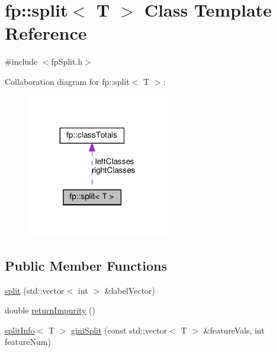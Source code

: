 \hypertarget{classfp_1_1split}{}\section{fp\+:\+:split$<$ T $>$ Class Template Reference}
\label{classfp_1_1split}


{\ttfamily \#include $<$fp\+Split.\+h$>$}



Collaboration diagram for fp\+:\+:split$<$ T $>$\+:\nopagebreak
\begin{figure}[H]
\begin{center}
\leavevmode
\includegraphics[width=176pt]{classfp_1_1split__coll__graph}
\end{center}
\end{figure}
\subsection*{Public Member Functions}
\begin{DoxyCompactItemize}
\item 
\hyperlink{classfp_1_1split_aa4634b2460fcbe77440805d0526e72b6}{split} (std\+::vector$<$ int $>$ \&label\+Vector)
\item 
double \hyperlink{classfp_1_1split_a8501016c02cb2c36b3d40ee120da872e}{return\+Impurity} ()
\item 
\hyperlink{classfp_1_1splitInfo}{split\+Info}$<$ T $>$ \hyperlink{classfp_1_1split_a6a98f17c8b3fc3b8047e4559f8b618b7}{gini\+Split} (const std\+::vector$<$ T $>$ \&feature\+Vals, int feature\+Num)
\end{DoxyCompactItemize}
